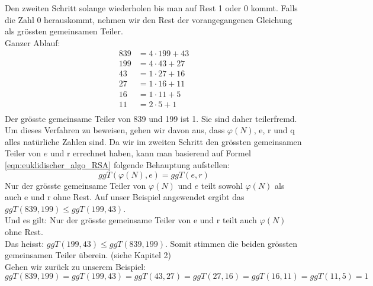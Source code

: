 Den zweiten Schritt solange wiederholen bis man auf Rest 1 oder 0 kommt. Falls die Zahl 0 herauskommt, nehmen wir den Rest der vorangegangenen Gleichung als grössten gemeinsamen Teiler.\\
%
Ganzer Ablauf:
\begin{equation*}
  \begin{split}
    839 &= 4 \cdot 199 + 43\\
    199 &= 4 \cdot 43 + 27\\
    43 &= 1 \cdot 27 + 16\\
    27 &= 1 \cdot 16 + 11\\
    16 &= 1 \cdot 11 + 5\\
    11 &= 2 \cdot 5 + 1\\
    \label{eqn:euqulid_beweis}
  \end{split}
\end{equation*}
%
Der grösste gemeinsame Teiler von 839 und 199 ist 1. Sie sind daher teilerfremd. \\[2ex]
Um dieses Verfahren zu beweisen, gehen wir davon aus, dass $\varphi(N)$, e, r und q alles natürliche  %
Zahlen sind. Da wir im zweiten Schritt den grössten gemeinsamen Teiler von $e$ und r errechnet haben, kann man basierend auf Formel \ref{eqn:euklidischer_algo_RSA} folgende Behauptung aufstellen:
%
\begin{equation}
  ggT(\varphi(N),e) = ggT(e,r)
  \label{eqn:ggT}
\end{equation}
%
Nur der grösste gemeinsame Teiler von $\varphi(N)$ und $e$ teilt sowohl $\varphi(N)$ als auch e und r ohne Rest. Auf unser Beispiel angewendet ergibt das $ggT(839,199) \leq ggT(199,43)$.\\
Und es gilt: Nur der grösste gemeinsame Teiler von e und r teilt auch $\varphi(N)$ ohne Rest.\\
Das heisst: $ggT(199,43) \leq ggT(839,199)$.
Somit stimmen die beiden grössten gemeinsamen Teiler überein. (siehe \cite{zahlentheorie_fuer_einsteiger} Kapitel 2)\\[2ex]
Gehen wir zurück zu unserem Beispiel:
%
\begin{equation*}
 ggT(839,199) = ggT(199,43) = ggT(43,27) = ggT(27,16) = ggT(16,11) = ggT(11,5) = 1
\end{equation*}
%
